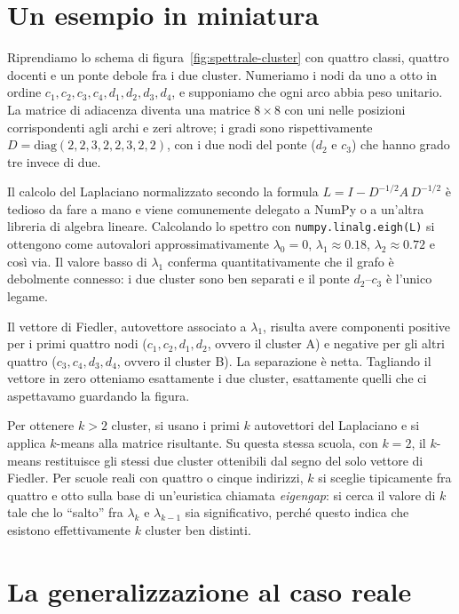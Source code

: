 \section{Un esempio in miniatura}

Riprendiamo lo schema di figura~\ref{fig:spettrale-cluster}
con quattro classi, quattro docenti e un ponte debole fra i
due cluster. Numeriamo i nodi da uno a otto in ordine
$c_1, c_2, c_3, c_4, d_1, d_2, d_3, d_4$, e supponiamo che
ogni arco abbia peso unitario. La matrice di adiacenza
diventa una matrice $8 \times 8$ con uni nelle posizioni
corrispondenti agli archi e zeri altrove; i gradi sono
rispettivamente $D = \mathrm{diag}(2, 2, 3, 2, 2, 3, 2, 2)$,
con i due nodi del ponte ($d_2$ e $c_3$) che hanno grado tre
invece di due.

Il calcolo del Laplaciano normalizzato secondo la formula
$L = I - D^{-1/2} A\, D^{-1/2}$ \`e tedioso da fare a mano e
viene comunemente delegato a NumPy o a un'altra libreria di
algebra lineare. Calcolando lo spettro con
\texttt{numpy.linalg.eigh(L)} si ottengono come autovalori
approssimativamente $\lambda_0 = 0$, $\lambda_1 \approx 0.18$,
$\lambda_2 \approx 0.72$ e cos\`i via. Il valore basso di
$\lambda_1$ conferma quantitativamente che il grafo \`e
debolmente connesso: i due cluster sono ben separati e il
ponte $d_2$--$c_3$ \`e l'unico legame.

Il vettore di Fiedler, autovettore associato a $\lambda_1$,
risulta avere componenti positive per i primi quattro nodi
($c_1, c_2, d_1, d_2$, ovvero il cluster A) e negative per
gli altri quattro ($c_3, c_4, d_3, d_4$, ovvero il cluster
B). La separazione \`e netta. Tagliando il vettore in zero
otteniamo esattamente i due cluster, esattamente quelli che
ci aspettavamo guardando la figura.

\begin{esempiobox}
Per ottenere $k > 2$ cluster, si usano i primi $k$
autovettori del Laplaciano e si applica $k$-means alla
matrice risultante. Su questa stessa scuola, con $k = 2$, il
$k$-means restituisce gli stessi due cluster ottenibili dal
segno del solo vettore di Fiedler. Per scuole reali con
quattro o cinque indirizzi, $k$ si sceglie tipicamente fra
quattro e otto sulla base di un'euristica chiamata
\emph{eigengap}: si cerca il valore di $k$ tale che lo
``salto'' fra $\lambda_k$ e $\lambda_{k-1}$ sia
significativo, perch\'e questo indica che esistono
effettivamente $k$ cluster ben distinti.
\end{esempiobox}

\section{La generalizzazione al caso reale}

